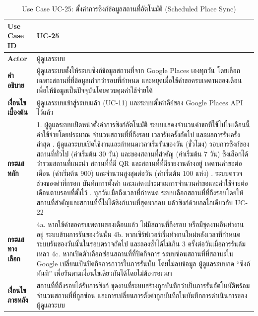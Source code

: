 \begin{table}[H]
\centering
\caption{Use Case UC-25: ตั้งค่าการซิงก์ข้อมูลสถานที่อัตโนมัติ (Scheduled Place Sync)}
\label{tab:uc25}
\begin{tabular}{|p{3.2cm}|p{10cm}|}
\hline
\textbf{Use Case ID} & UC-25 \\ \hline
\textbf{Actor} & ผู้ดูแลระบบ \\ \hline
\textbf{คำอธิบาย} & ผู้ดูแลระบบตั้งให้ระบบซิงก์ข้อมูลสถานที่จาก Google Places เองทุกวัน โดยเลือกเฉพาะสถานที่ที่ข้อมูลเก่ากว่ารอบที่กำหนด และหยุดเมื่อใช้คำขอครบเพดานของเดือน เพื่อให้ข้อมูลเป็นปัจจุบันโดยควบคุมค่าใช้จ่ายได้ \\ \hline
\textbf{เงื่อนไขเบื้องต้น} & ผู้ดูแลระบบเข้าสู่ระบบแล้ว (UC-11) และระบบตั้งค่าคีย์ของ Google Places API ไว้แล้ว \\ \hline
\textbf{กระแสหลัก} & 1. ผู้ดูแลระบบเปิดหน้าตั้งค่าการซิงก์อัตโนมัติ ระบบแสดงจำนวนคำขอที่ใช้ไปในเดือนนี้ ค่าใช้จ่ายโดยประมาณ จำนวนสถานที่ที่ถึงรอบ เวลารันครั้งถัดไป และผลการรันครั้งล่าสุด \newline 2. ผู้ดูแลระบบเปิดใช้งานและกำหนดเวลาเริ่มรันของวัน (ชั่วโมง) รอบการซิงก์ของสถานที่ทั่วไป (ค่าเริ่มต้น 30 วัน) และของสถานที่สำคัญ (ค่าเริ่มต้น 7 วัน) ซึ่งเลือกได้ว่ารวมสถานที่แนะนำ สถานที่ที่มี QR และสถานที่ที่มีรายงานค้างอยู่ เพดานคำขอต่อเดือน (ค่าเริ่มต้น 900) และจำนวนสูงสุดต่อวัน (ค่าเริ่มต้น 100 แห่ง) \newline 3. ระบบตรวจช่วงของค่าที่กรอก บันทึกการตั้งค่า และแสดงประมาณการจำนวนคำขอและค่าใช้จ่ายต่อเดือนตามรอบที่ตั้งไว้ \newline 4. ทุกวันเมื่อถึงเวลาที่กำหนด ระบบเลือกสถานที่ที่ถึงรอบโดยให้สถานที่สำคัญและสถานที่ที่ไม่ได้ซิงก์นานที่สุดมาก่อน แล้วซิงก์ด้วยกลไกเดียวกับ UC-22 \\ \hline
\textbf{กระแสทางเลือก} & 4a. หากใช้คำขอครบเพดานของเดือนแล้ว ไม่มีสถานที่ถึงรอบ หรือมีชุดงานอื่นทำงานอยู่ ระบบข้ามการรันของวันนั้น \newline 4b. หากเซิร์ฟเวอร์เริ่มทำงานใหม่หลังเวลาที่กำหนด ระบบรันของวันนั้นในรอบตรวจถัดไป และลองซ้ำได้ไม่เกิน 3 ครั้งต่อวันเมื่อการรันล้มเหลว \newline 4c. หากเปิดตัวเลือกซ่อนสถานที่ที่ปิดกิจการ ระบบซ่อนสถานที่ที่สถานะใน Google เปลี่ยนเป็นปิดกิจการถาวรในการรันนั้น โดยไม่ลบข้อมูล \newline ผู้ดูแลระบบกด ``ซิงก์ทันที'' เพื่อรันตามเงื่อนไขเดียวกันได้โดยไม่ต้องรอเวลา \\ \hline
\textbf{เงื่อนไขภายหลัง} & สถานที่ที่ถึงรอบได้รับการซิงก์ ชุดงานที่ระบบสร้างถูกบันทึกว่าเป็นการรันอัตโนมัติพร้อมจำนวนสถานที่ที่ถูกซ่อน และการเปลี่ยนการตั้งค่าถูกบันทึกในบันทึกการดำเนินการของผู้ดูแลระบบ \\
\hline
\end{tabular}
\end{table}

